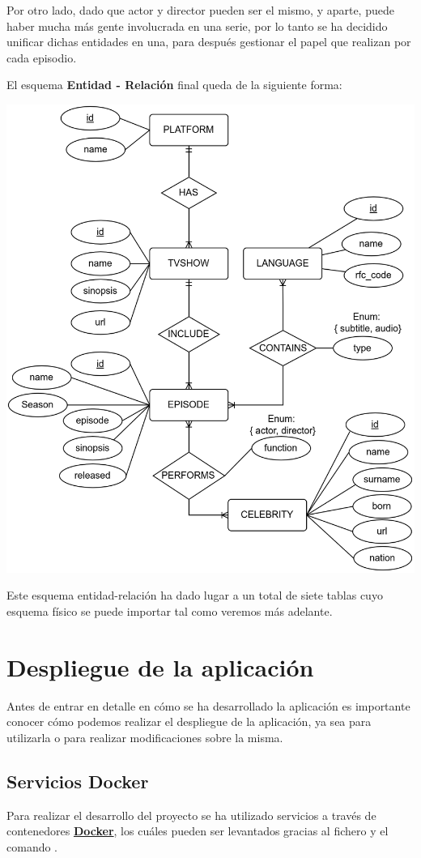 \documentclass{\ClassPath/viu-tfm-template}
\begin{document}
Por otro lado, dado que actor y director pueden ser el mismo, y aparte, puede haber mucha más gente involucrada en una serie, por lo tanto se ha decidido unificar dichas entidades en una, para después gestionar el papel que realizan por cada episodio.

El esquema \textbf{Entidad - Relación} final queda de la siguiente forma:

\begin{center}
    \includegraphics[width=0.8\linewidth]{img/entidad-relacion.png}
\end{center}


Este esquema entidad-relación ha dado lugar a un total de siete tablas cuyo esquema físico se puede importar tal como veremos más adelante.

\chapter{Despliegue de la aplicación}
Antes de entrar en detalle en cómo se ha desarrollado la aplicación es importante conocer cómo podemos realizar el despliegue de la aplicación, ya sea para utilizarla o para realizar modificaciones sobre la misma.

\section{Servicios Docker}
Para realizar el desarrollo del proyecto se ha utilizado servicios a través de contenedores \textbf{\href{https://www.docker.com/}{Docker}}, los cuáles pueden ser levantados gracias al fichero  y el comando 
.
\end{document}

